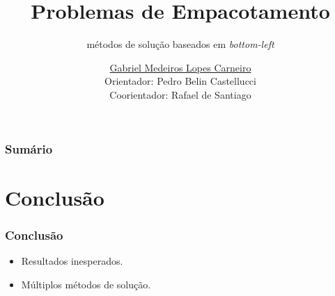 \documentclass[12pt]{beamer}
\title{Problemas de Empacotamento}
\subtitle{métodos de solução baseados em \textit{bottom-left}}
\author[\href{https://github.com/G-Carneiro}{Gabriel Carneiro}]{
    \href{https://github.com/G-Carneiro}{Gabriel Medeiros Lopes Carneiro} \\
    Orientador: Pedro Belin Castellucci \\
    Coorientador: Rafael de Santiago
}
\institute[UFSC]{Universidade Federal de Santa Catarina}
\begin{document}
    \begin{frame}[plain]
        \titlepage
    \end{frame}

    \begin{frame}
        \frametitle{Sumário}
        \tableofcontents
    \end{frame}


    
    
    
    


    \section{Conclusão}\label{sec:conclusao}
    \begin{frame}
        \frametitle{Conclusão}
        \begin{itemize}
            \item Resultados inesperados.
            \item Múltiplos métodos de solução.
        \end{itemize}
    \end{frame}
\end{document}
